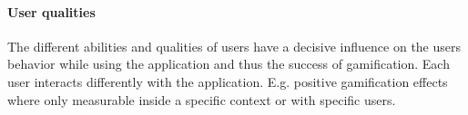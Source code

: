 \paragraph*{User qualities}

The different abilities and qualities of users have a decisive influence on the users behavior while using the application and thus the success of gamification. Each user interacts differently with the application. E.g. positive gamification effects where only measurable inside a specific context or with specific users. \cite[p. 3029, 3030]{hamariDoesGamificationWork2014}


\newpage
